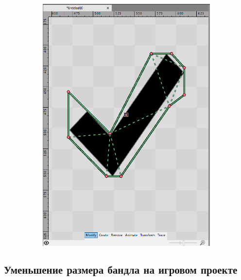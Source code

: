 \documentclass{fefu_thesis/cls/fefu}
\begin{document}
\begin{figure}[H]
\begin{subfigure}{.32\linewidth}
            \includegraphics[scale=0.25]{images/CheckDone.png}
        \end{subfigure}
    \end{figure}

    \subsection{Уменьшение размера бандла на игровом проекте}
\end{document}
